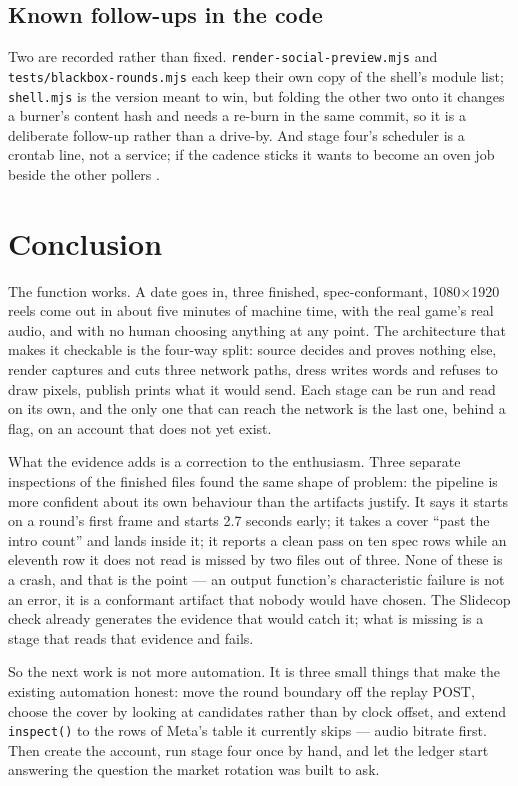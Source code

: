 \documentclass[10pt,letterpaper,twocolumn]{article}
\newcommand{\code}[1]{\texttt{#1}}
\begin{document}
\subsection{Known follow-ups in the code}

Two are recorded rather than fixed. \code{render-\allowbreak social-\allowbreak preview.mjs} and
\code{tests/blackbox-rounds.mjs} each keep their own copy of the shell's module
list; \code{shell.mjs} is the version meant to win, but folding the other two
onto it changes a burner's content hash and needs a re-burn in the same commit,
so it is a deliberate follow-up rather than a drive-by. And stage four's
scheduler is a crontab line, not a service; if the cadence sticks it wants to
become an oven job beside the other pollers \cite{acmarketing}.

\section{Conclusion}

The function works. A date goes in, three finished, spec-conformant,
1080$\times$1920 reels come out in about five minutes of machine time, with the
real game's real audio, and with no human choosing anything at any point. The
architecture that makes it checkable is the four-way split: source decides and
proves nothing else, render captures and cuts three network paths, dress writes
words and refuses to draw pixels, publish prints what it would send. Each stage
can be run and read on its own, and the only one that can reach the network is
the last one, behind a flag, on an account that does not yet exist.

What the evidence adds is a correction to the enthusiasm. Three separate
inspections of the finished files found the same shape of problem: the pipeline
is more confident about its own behaviour than the artifacts justify. It says it
starts on a round's first frame and starts 2.7 seconds early; it takes a cover
``past the intro count'' and lands inside it; it reports a clean pass on ten
spec rows while an eleventh row it does not read is missed by two files out of
three. None of these is a crash, and that is the point --- an output function's
characteristic failure is not an error, it is a conformant artifact that nobody
would have chosen. The Slidecop check already generates the evidence that would
catch it; what is missing is a stage that reads that evidence and fails.

So the next work is not more automation. It is three small things that make the
existing automation honest: move the round boundary off the replay POST, choose
the cover by looking at candidates rather than by clock offset, and extend
\code{inspect()} to the rows of Meta's table it currently skips --- audio
bitrate first. Then create the account, run stage four once by hand, and let the
ledger start answering the question the market rotation was built to ask.

\scriptsize


\end{document}
